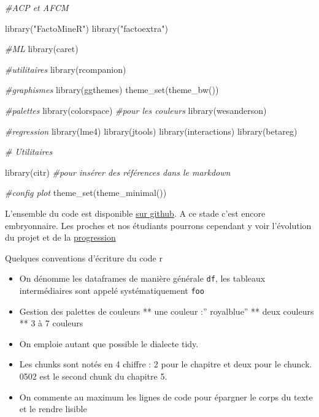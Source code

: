 \documentclass[
]{book}
\newenvironment{Shaded}{\begin{snugshade}}{\end{snugshade}}
\newcommand{\CommentTok}[1]{\textcolor[rgb]{0.56,0.35,0.01}{\textit{#1}}}
\newcommand{\FunctionTok}[1]{\textcolor[rgb]{0.00,0.00,0.00}{#1}}
\newcommand{\NormalTok}[1]{#1}
\newcommand{\StringTok}[1]{\textcolor[rgb]{0.31,0.60,0.02}{#1}}
\providecommand{\tightlist}{%
  \setlength{\itemsep}{0pt}\setlength{\parskip}{0pt}}
\begin{document}
\begin{Shaded}
\begin{Highlighting}[]
\CommentTok{\#ACP et AFCM}

\FunctionTok{library}\NormalTok{(}\StringTok{"FactoMineR"}\NormalTok{)}
\FunctionTok{library}\NormalTok{(}\StringTok{"factoextra"}\NormalTok{)}


\CommentTok{\#ML}
\FunctionTok{library}\NormalTok{(caret)}

\CommentTok{\#utilitaires}
\FunctionTok{library}\NormalTok{(rcompanion)}

\CommentTok{\#graphismes}
\FunctionTok{library}\NormalTok{(ggthemes)}
\FunctionTok{theme\_set}\NormalTok{(}\FunctionTok{theme\_bw}\NormalTok{())}


\CommentTok{\#palettes}
\FunctionTok{library}\NormalTok{(colorspace) }\CommentTok{\#pour les couleurs}
\FunctionTok{library}\NormalTok{(wesanderson)}

\CommentTok{\#regression}
\FunctionTok{library}\NormalTok{(lme4)}
\FunctionTok{library}\NormalTok{(jtools)}
\FunctionTok{library}\NormalTok{(interactions)}
\FunctionTok{library}\NormalTok{(betareg)}


\CommentTok{\# Utilitaires}

\FunctionTok{library}\NormalTok{(citr) }\CommentTok{\#pour insérer des références dans le markdown}

\CommentTok{\#config plot}
\FunctionTok{theme\_set}\NormalTok{(}\FunctionTok{theme\_minimal}\NormalTok{())}
\end{Highlighting}
\end{Shaded}

L'ensemble du code est disponible \href{https://github.com/BenaventC/Datasciences}{sur github}. A ce stade c'est encore embryonnaire. Les proches et nos étudiants pourrons cependant y voir l'évolution du projet et de la \href{https://benaventc.github.io/Datascience/}{progression}

Quelques conventions d'écriture du code r

\begin{itemize}
\tightlist
\item
  On dénomme les dataframes de manière générale \texttt{df}, les tableaux intermédiaires sont appelé systématiquement \texttt{foo}
\item
  Gestion des palettes de couleurs
  ** une couleur :'' royalblue''
  ** deux couleurs
  ** 3 à 7 couleurs
\item
  On emploie autant que possible le dialecte tidy.
\item
  Les chunks sont notés en 4 chiffre : 2 pour le chapitre et deux pour le chunck. 0502 est le second chunk du chapitre 5.
\item
  On commente au maximum les lignes de code pour épargner le corps du texte et le rendre lisible
\end{itemize}
\end{document}
